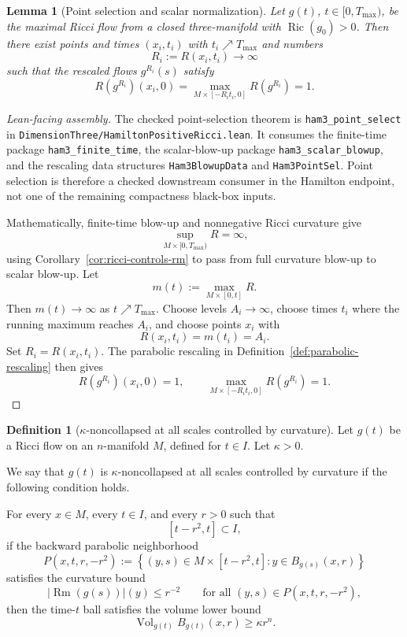 \documentclass[11pt]{article}
\theoremstyle{plain}
\newtheorem{lemma}[theorem]{Lemma}
\theoremstyle{definition}
\newtheorem{definition}[theorem]{Definition}
\theoremstyle{remark}
\newcommand{\Ric}{\operatorname{Ric}}
\newcommand{\Rm}{\operatorname{Rm}}
\newcommand{\Vol}{\operatorname{Vol}}
\newcommand{\norm}[1]{\left|#1\right|}
\newcommand{\leanref}[1]{\nolinkurl{#1}}
\newcommand{\leanfile}[1]{\nolinkurl{#1}}
\newcommand{\rffile}[1]{\leanfile{#1}}
\begin{document}
\begin{lemma}[Point selection and scalar normalization]
\label{lem:point-selection-rescaling}
Let $g(t)$, $t\in[0,T_{\max})$, be the maximal Ricci flow from a closed
three-manifold with $\Ric(g_0)>0$. Then there exist points and times
$(x_i,t_i)$ with $t_i\nearrow T_{\max}$ and numbers
\[
R_i:=R(x_i,t_i)\to\infty
\]
such that the rescaled flows $g^{R_i}(s)$ satisfy
\[
R(g^{R_i})(x_i,0)=
\max_{M\times[-R_it_i,0]}R(g^{R_i})
=1.
\]
\end{lemma}

\begin{proof}[Lean-facing assembly]
The checked point-selection theorem is \leanref{ham3_point_select} in
\rffile{DimensionThree/HamiltonPositiveRicci.lean}.  It consumes the finite-time package
\leanref{ham3_finite_time}, the scalar-blow-up package
\leanref{ham3_scalar_blowup}, and the rescaling data structures
\leanref{Ham3BlowupData} and \leanref{Ham3PointSel}.  Point selection is
therefore a checked downstream consumer in the Hamilton endpoint, not one of
the remaining compactness black-box inputs.

Mathematically, finite-time blow-up and nonnegative Ricci curvature give
\[
\sup_{M\times[0,T_{\max})}R=\infty,
\]
using Corollary~\ref{cor:ricci-controls-rm} to pass from full curvature blow-up
to scalar blow-up.  Let
\[
  m(t):=\max_{M\times[0,t]}R.
\]
Then \(m(t)\to\infty\) as \(t\nearrow T_{\max}\).  Choose levels
\(A_i\to\infty\), choose times \(t_i\) where the running maximum reaches
\(A_i\), and choose points \(x_i\) with
\[
  R(x_i,t_i)=m(t_i)=A_i.
\]
Set \(R_i=R(x_i,t_i)\).  The parabolic rescaling in
Definition~\ref{def:parabolic-rescaling} then gives
\[
  R(g^{R_i})(x_i,0)=1,
  \qquad
  \max_{M\times[-R_it_i,0]}R(g^{R_i})=1.
\]
\end{proof}

\begin{definition}[\texorpdfstring{$\kappa$}{kappa}-noncollapsed at all scales controlled by curvature]
\label{def:kappa-noncollapsed}
Let $g(t)$ be a Ricci flow on an $n$-manifold $M$, defined for
$t\in I$. Let $\kappa>0$.

We say that $g(t)$ is $\kappa$-noncollapsed at all scales controlled by
curvature if the following condition holds.

For every $x\in M$, every $t\in I$, and every $r>0$ such that
\[
[t-r^2,t]\subset I,
\]
if the backward parabolic neighborhood
\[
P(x,t,r,-r^2)
:=
\left\{
(y,s)\in M\times[t-r^2,t]
:
y\in B_{g(s)}(x,r)
\right\}
\]
satisfies the curvature bound
\[
\norm{\Rm(g(s))}(y)\le r^{-2}
\qquad
\text{for all }(y,s)\in P(x,t,r,-r^2),
\]
then the time-$t$ ball satisfies the volume lower bound
\[
\Vol_{g(t)} B_{g(t)}(x,r)\ge \kappa r^n.
\]
\end{definition}
\end{document}
